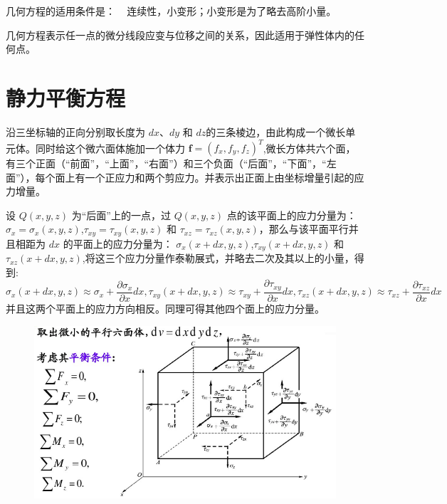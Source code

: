 \documentclass[12pt,a4paper]{article}
\begin{document}
几何方程的适用条件是： ~ 连续性，小变形；小变形是为了略去高阶小量。

几何方程表示任一点的微分线段应变与位移之间的关系，因此适用于弹性体内的任何点。

\section{静力平衡方程}
沿三坐标轴的正向分别取长度为 $dx$、$dy$ 和 $dz$的三条棱边，由此构成一个微长单元体。同时给这个微六面体施加一个体力 $\textbf{f}=(f_x,f_y,f_z)^T$,微长方体共六个面，有三个正面（“前面”，“上面”，“右面”）和三个负面（“后面”，“下面”，“左面”），每个面上有一个正应力和两个剪应力。并表示出正面上由坐标增量引起的应力增量。

设 $Q(x,y,z)$ 为“后面”上的一点，过 $Q(x,y,z)$ 点的该平面上的应力分量为： $\sigma_x=\sigma_x(x,y,z)$,$\tau_{xy}=\tau_{xy}(x,y,z)$ 和 $\tau_{xz}=\tau_{xz}(x,y,z)$，那么与该平面平行并且相距为 $dx$ 的平面上的应力分量为： $\sigma_x(x+dx,y,z)$,$\tau_{xy}(x+dx,y,z)$ 和 $\tau_{xz}(x+dx,y,z)$,将这三个应力分量作泰勒展式，并略去二次及其以上的小量，得到:
$$
\sigma_x(x+dx,y,z)\approx \sigma_x+\frac{\partial\sigma_x}{\partial x}dx,\tau_{xy}(x+dx,y,z)\approx \tau_{xy}+\frac{\partial\tau_{xy}}{\partial x}dx,\tau_{xz}(x+dx,y,z)\approx \tau_{xz}+\frac{\partial\tau_{xz}}{\partial x}dx
$$
并且这两个平面上的应力方向相反。同理可得其他四个面上的应力分量。

\begin{figure}[H]
\centering
\includegraphics[scale=0.5]{./figures/15.png}
\caption{}
\end{figure}
\end{document}
